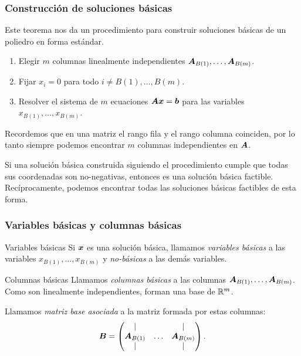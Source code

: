 \documentclass[aspectratio=169,12pt,spanish]{beamer}
\begin{document}

\begin{frame}
\frametitle{Construcción de soluciones básicas}

Este teorema nos da un procedimiento para construir soluciones básicas de un poliedro en forma estándar.

\begin{enumerate}
\item Elegir $m$ columnas linealmente independientes $\bm{A}_{B(1)}, \dots, \bm{A}_{B(m)}$.
\item Fijar $x_i = 0$ para todo $i \neq B(1), \dots, B(m)$.
\item Resolver el sistema de $m$ ecuaciones $\bm{A}\bm{x} = \bm{b}$ para las variables $x_{B(1)}, \dots, x_{B(m)}$.
\end{enumerate}

Recordemos que en una matriz el rango fila y el rango columna coinciden, por lo tanto siempre podemos encontrar $m$ columnas independientes en $\bm{A}$.

Si una solución básica construida siguiendo el procedimiento cumple que todas sus coordenadas son no-negativas, entonces es una solución básica factible. Recíprocamente, podemos encontrar todas las soluciones básicas factibles de esta forma.


\end{frame}


\begin{frame}
\frametitle{Variables básicas y columnas básicas}

\begin{block}{Variables básicas}
Si $\bm{x}$ es una solución básica, llamamos \emph{variables básicas} a las variables $x_{B(1)}, \dots, x_{B(m)}$ y \emph{no-básicas} a las demás variables.
\end{block}

\begin{block}{Columnas básicas}
Llamamos \emph{columnas básicas} a las columnas $\bm{A}_{B(1)}, \dots, \bm{A}_{B(m)}$. Como son linealmente independientes, forman una base de $\mathbb{R}^m$. \end{block}

Llamamos \emph{matriz base asociada} a la matriz formada por estas columnas:
$$
\bm{B} = \begin{pmatrix} \vert & & \vert \\ \bm{A}_{B(1)} & \dots & \bm{A}_{B(m)} \\ \vert & & \vert \end{pmatrix}.
$$

\end{frame}
\end{document}
